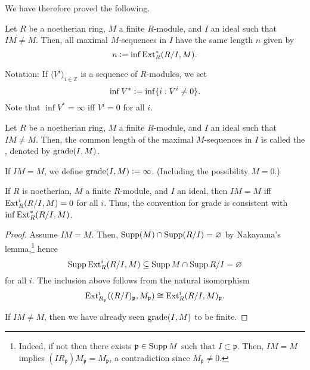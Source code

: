 \documentclass[12pt]{article}
\begin{document}
We have therefore proved the following.

\begin{thm}[Rees] \label{thm:grade-ext}
	Let $R$ be a noetherian ring, $M$ a finite $R$-module, and $I$ an ideal such that $IM \neq M$. Then, all maximal $M$-sequences in $I$ have the same length $n$ given by
	\begin{equation*} 
		n \vcentcolon= \inf \operatorname{Ext}_{R}^{\ast}(R/I, M).
	\end{equation*}
\end{thm}

Notation: If $\langle V^{i} \rangle_{i \in \mathbb{Z}}$ is a sequence of $R$-modules, we set
\begin{equation*} 
	\inf V^{\ast} \vcentcolon= \inf\{i : V^{i} \neq 0\}.
\end{equation*}
Note that $\inf V^{\ast} = \infty$ iff $V^{i} = 0$ for all $i$.

\begin{defn}
	Let $R$ be a noetherian ring, $M$ a finite $R$-module, and $I$ an ideal such that $IM \neq M$. Then, the common length of the maximal $M$-sequences in $I$ is called the , denoted by $\operatorname{grade}(I, M)$.

	If $IM = M$, we define $\operatorname{grade}(I, M) \vcentcolon= \infty$. (Including the possibility $M = 0$.)
\end{defn}

\begin{lem} 
	If $R$ is noetherian, $M$ a finite $R$-module, and $I$ an ideal, then $IM = M$ iff $\operatorname{Ext}_{R}^{i}(R/I, M) = 0$ for all $i$. Thus, the convention for grade is consistent with $\inf \operatorname{Ext}_{R}^{\ast}(R/I, M)$.
\end{lem}
\begin{proof} 
	\forward Assume $IM = M$. Then, $\operatorname{Supp}(M) \cap \operatorname{Supp}(R/I) = \varnothing$ by Nakayama's lemma,\footnote{Indeed, if not then there exists $\mathfrak{p} \in \operatorname{Supp} M$ such that $I \subset \mathfrak{p}$. Then, $IM = M$ implies $(I R_{\mathfrak{p}}) M_{\mathfrak{p}} = M_{\mathfrak{p}}$, a contradiction since $M_{\mathfrak{p}} \neq 0$.} hence
	\begin{equation*} 
		\operatorname{Supp} \operatorname{Ext}_{R}^{i}(R/I, M) \subseteq \operatorname{Supp} M \cap \operatorname{Supp} R/I = \varnothing
	\end{equation*}
	for all $i$. The inclusion above follows from the natural isomorphism
	\begin{equation*} 
		\operatorname{Ext}_{R_{\mathfrak{p}}}^{i}((R/I)_{\mathfrak{p}}, M_{\mathfrak{p}}) \cong \operatorname{Ext}_{R}^{i}(R/I, M)_{\mathfrak{p}}.
	\end{equation*}

	\backward If $IM \neq M$, then we have already seen $\operatorname{grade}(I, M)$ to be finite.
\end{proof}
\end{document}
